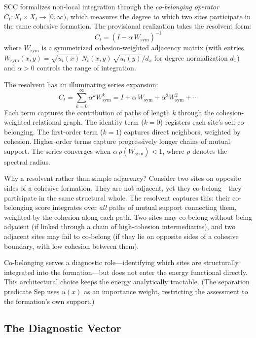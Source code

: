 \documentclass[lettersize,journal]{IEEEtran}
\begin{document}
SCC formalizes non-local integration through the \emph{co-belonging operator} $C_t : X_t \times X_t \to [0,\infty)$, which measures the degree to which two sites participate in the same cohesive formation. The provisional realization takes the resolvent form:
\begin{equation}
C_t = (I - \alpha\, W_{\mathrm{sym}})^{-1}
\end{equation}
where $W_{\mathrm{sym}}$ is a symmetrized cohesion-weighted adjacency matrix (with entries $W_{\mathrm{sym}}(x,y) = \sqrt{u_t(x)}\, N_t(x,y)\, \sqrt{u_t(y)} / d_x$ for degree normalization $d_x$) and $\alpha > 0$ controls the range of integration.

The resolvent has an illuminating series expansion:
\begin{equation}
C_t = \sum_{k=0}^{\infty} \alpha^k W_{\mathrm{sym}}^k = I + \alpha\, W_{\mathrm{sym}} + \alpha^2 W_{\mathrm{sym}}^2 + \cdots
\end{equation}
Each term captures the contribution of paths of length $k$ through the cohesion-weighted relational graph. The identity term ($k=0$) registers each site's self-co-belonging. The first-order term ($k=1$) captures direct neighbors, weighted by cohesion. Higher-order terms capture progressively longer chains of mutual support. The series converges when $\alpha\, \rho(W_{\mathrm{sym}}) < 1$, where $\rho$ denotes the spectral radius.

Why a resolvent rather than simple adjacency? Consider two sites on opposite sides of a cohesive formation. They are not adjacent, yet they co-belong---they participate in the same structural whole. The resolvent captures this: their co-belonging score integrates over \emph{all} paths of mutual support connecting them, weighted by the cohesion along each path. Two sites may co-belong without being adjacent (if linked through a chain of high-cohesion intermediaries), and two adjacent sites may fail to co-belong (if they lie on opposite sides of a cohesive boundary, with low cohesion between them).

Co-belonging serves a diagnostic role---identifying which sites are structurally integrated into the formation---but does not enter the energy functional directly. This architectural choice keeps the energy analytically tractable. (The separation predicate $\text{Sep}$ uses $u(x)$ as an importance weight, restricting the assessment to the formation's own support.)

\subsection{The Diagnostic Vector}
\end{document}
